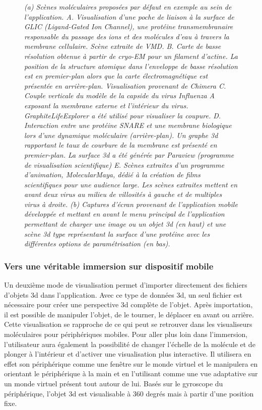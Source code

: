 \begin{figure}[h]
\caption[Exemples de scènes moléculaires créées pour l'application mobile.]{{\it (a) Scènes moléculaires proposées par défaut en exemple au sein de l'application.
A. Visualisation d'une poche de liaison à la surface de GLIC (Ligand-Gated Ion Channel), une protéine transmembranaire responsable du passage des ions et des molécules d'eau à travers la membrane cellulaire. Scène extraite de VMD. B. Carte de basse résolution obtenue à partir de cryo-EM pour un filament d'actine. La position de la structure atomique dans l'enveloppe de basse résolution est en premier-plan alors que la carte électromagnétique est présentée en arrière-plan. Visualisation provenant de Chimera C. Couple verticale du modèle de la capside du virus Influenza A exposant la membrane externe et l'intérieur du virus. GraphiteLifeExplorer a été utilisé pour visualiser la coupure. D. Interaction entre une protéine SNARE et une membrane biologique lors d'une dynamique moléculaire (arrière-plan). Un graphe 3d rapportant le taux de courbure de la membrane est présenté en premier-plan. La surface 3d a été générée par Paraview (programme de visualisation scientifique) E. Scènes extraites d'un programme d'animation, MolecularMaya, dédié à la création de films scientifiques pour une audience large. Les scènes extraites mettent en avant deux virus au milieu de villosités à gauche et de multiples virus à droite.
(b) Captures d'écran provenant de l'application mobile développée et mettant en avant le menu principal de l'application permettant de charger une image ou un objet 3d (en haut) et une scène 3d type représentant la surface d'une protéine avec les différentes options de paramétrisation (en bas).}}
\end{figure}

\subsubsection{Vers une véritable immersion sur dispositif mobile}

Un deuxième mode de visualisation permet d'importer directement des fichiers d'objets 3d dans l'application. Avec ce type de données 3d, un seul fichier est nécessaire pour créer une perspective 3d complète de l'objet. Après importation, il est possible de manipuler l'objet, de le tourner, le déplacer en avant ou arrière. Cette visualisation se rapproche de ce qui peut se retrouver dans les visualiseurs moléculaires pour périphériques mobiles. Pour aller plus loin dans l'immersion, l'utilisateur aura également la possibilité de changer l'échelle de la molécule et de plonger à l'intérieur et d'activer une visualisation plus interactive. Il utilisera en effet son périphérique comme une fenêtre sur le monde virtuel et le manipulera en orientant le périphérique à la main et en l'utilisant comme une vue adaptative sur un monde virtuel présent tout autour de lui. Basés sur le gyroscope du périphérique, l'objet 3d est visualisable à 360 degrés mais à partir d'une position fixe. 

